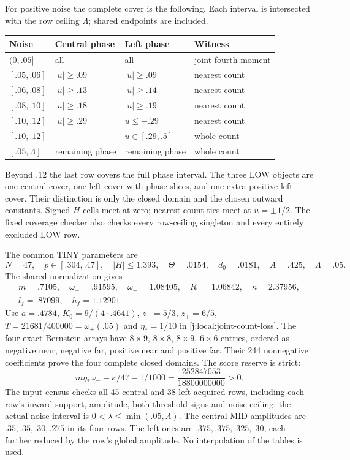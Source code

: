 For positive noise the complete cover is the following. Each interval is
intersected with the row ceiling $\Lambda$; shared endpoints are included.
\begin{center}\small
\begin{tabular}{@{}llll@{}}\toprule
Noise & Central phase & Left phase & Witness\\\midrule
$(0,.05]$ & all & all & joint fourth moment\\
$[.05,.06]$ & $|u|\ge.09$ & $|u|\ge.09$ & nearest count\\
$[.06,.08]$ & $|u|\ge.13$ & $|u|\ge.14$ & nearest count\\
$[.08,.10]$ & $|u|\ge.18$ & $|u|\ge.19$ & nearest count\\
$[.10,.12]$ & $|u|\ge.29$ & $u\le-.29$ & nearest count\\
$[.10,.12]$ & --- & $u\in[.29,.5]$ & whole count\\
$[.05,\Lambda]$ & remaining phase & remaining phase & whole count\\\bottomrule
\end{tabular}
\end{center}
Beyond $.12$ the last row covers the full phase interval. The three LOW
objects are one central cover, one left cover with phase slices, and one
extra positive left cover. Their distinction is only the closed domain
and the chosen outward constants. Signed $H$ cells meet at zero; nearest
count ties meet at $u=\pm1/2$. The fixed coverage checker also checks every
row-ceiling singleton and every entirely excluded LOW row.

The common TINY parameters are
\[
 N=47,\quad p\in[.304,.47],\quad |H|\le1.393,\quad
 \Theta=.0154,\quad d_0=.0181,\quad A=.425,\quad\Lambda=.05.
\]
The shared normalization gives
\[
 \begin{gathered}
 m=.7105,\quad \omega_-=.91595,\quad\omega_+=1.08405,\quad
 R_0=1.06842,\quad \kappa=2.37956,\\
 l_f=.87099,\quad h_f=1.12901.
 \end{gathered}
\]
Use $a=.4784$, $K_0=9/(4\cdot.4641)$, $z_-=5/3$, $z_+=6/5$,
$T=21681/400000=\omega_+(.05)$ and $\eta_*=1/10$ in
\eqref{j:local:joint-count-loss}. The four exact Bernstein arrays have
$8\times9$, $8\times8$, $8\times9$, $6\times6$ entries, ordered as
negative near, negative far, positive near and positive far.
Their 244 nonnegative coefficients prove the four complete closed domains.
The score reserve is strict:
\[
 m\eta_*\omega_- -\kappa/47-1/1000
             =\frac{252847053}{18800000000}>0.
\]
The input census checks all 45 central and 38 left acquired rows, including
each row's inward support, amplitude, both threshold signs and noise ceiling;
the actual noise interval is $0<\lambda\le\min(.05,\Lambda)$.
The central MID amplitudes are $.35,.35,.30,.275$ in its four rows.
The left ones are $.375,.375,.325,.30$, each further reduced by the row's
global amplitude. No interpolation of the tables is used.

